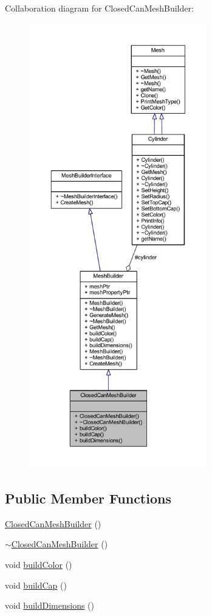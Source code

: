 Collaboration diagram for Closed\+Can\+Mesh\+Builder\+:
\nopagebreak
\begin{figure}[H]
\begin{center}
\leavevmode
\includegraphics[height=550pt]{class_closed_can_mesh_builder__coll__graph}
\end{center}
\end{figure}
\subsection*{Public Member Functions}
\begin{DoxyCompactItemize}
\item 
\mbox{\hyperlink{class_closed_can_mesh_builder_ad8b7ef135bd9e0387dc59658fc66fe97}{Closed\+Can\+Mesh\+Builder}} ()
\item 
\mbox{\hyperlink{class_closed_can_mesh_builder_a7c400fe6752eaf7dcf578de0542bcdb6}{$\sim$\+Closed\+Can\+Mesh\+Builder}} ()
\item 
void \mbox{\hyperlink{class_closed_can_mesh_builder_ae99058cb912a5d9e1f34e49241f4c8c7}{build\+Color}} ()
\item 
void \mbox{\hyperlink{class_closed_can_mesh_builder_a6fd7852b01e6afc04346f80a5f2f4459}{build\+Cap}} ()
\item 
void \mbox{\hyperlink{class_closed_can_mesh_builder_a5d9a174577e0957f768300b32fd367cf}{build\+Dimensions}} ()
\end{DoxyCompactItemize}
